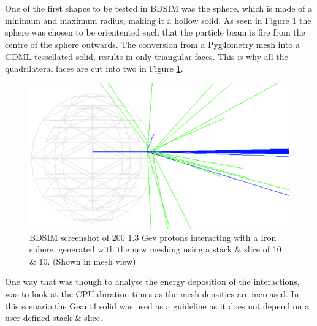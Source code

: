 \documentclass[12pt,a4paper]{article}
\begin{document}
\\\\
One of the first shapes to be tested in BDSIM was the sphere, which is made of a minimum and maximum radius, making it a hollow solid. As seen in Figure \ref{sphbd} the sphere was chosen to be orientented such that the particle beam is fire from the centre of the sphere outwards. The conversion from a Pyg4ometry mesh into a GDML tessellated solid, results in only triangular faces. This is why all the quadrilateral faces are cut into two in Figure \ref{sphbd}.

\begin{figure}[h!]
\centering
\includegraphics[scale=1]{Images//BDSIM//ProtonSphere.png}
\caption[width=\columnwidth]{BDSIM screenshot of 200 1.3 Gev protons interacting with a Iron sphere, generated with the new meshing using a stack \& slice of 10 \& 10. (Shown in mesh view)}
\label{sphbd}
\end{figure}

\noindent One way that was though to analyse the energy deposition of the interactions, was to look at the CPU duration times as the mesh densities are increased. In this scenario the Geant4 solid was used as a guideline as it does not depend on a user defined stack \& slice. 
\end{document}
